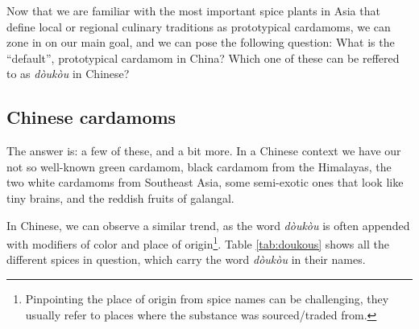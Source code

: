 \documentclass[12pt]{article}
\newcommand{\tc}[1]{\traditionalchinesefont{#1}\rmfamily}
\begin{document}

Now that we are familiar with the most important spice plants in Asia that define local or regional culinary traditions as prototypical cardamoms, we can zone in on our main goal, and we can pose the following question: What is the ``default'', prototypical cardamom in China? Which one of these can be reffered to as \textit{dòukòu} in Chinese?

\subsection{Chinese cardamoms}

The answer is: a few of these, and a bit more. In a Chinese context we have our not so well-known green cardamom, black cardamom from the Himalayas, the two white cardamoms from Southeast Asia, some semi-exotic ones that look like tiny brains, and the reddish fruits of galangal.

In Chinese, we can observe a similar trend, as the word \tc{豆蔻} \textit{dòukòu} is often appended with modifiers of color and place of origin\footnote{Pinpointing the place of origin from spice names can be challenging, they usually refer to places where the substance was sourced/traded from.}. Table \ref{tab:doukous} shows all the different spices in question, which carry the word \textit{dòukòu} in their names. 

\parencite{hu_2005_food}
\end{document}
